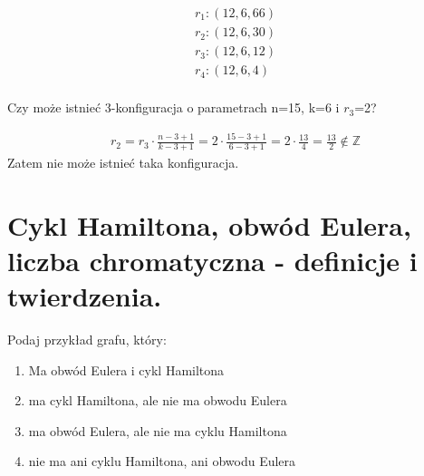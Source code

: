 \documentclass[main.tex]{subfiles}
\begin{document}
    \begin{align*}
        r_1: (12,6,66) \\
        r_2: (12,6,30) \\
        r_3: (12,6,12) \\
        r_4: (12,6,4) \\
    \end{align*}

    \begin{exercise}
        Czy może istnieć 3-konfiguracja o parametrach n=15, k=6 i $r_3$=2?
    \end{exercise}

    \begin{align*}
        r_2=r_3\cdot \frac{n-3+1}{k-3+1}=2\cdot \frac{15-3+1}{6-3+1}=2\cdot \frac{13}{4}=\frac{13}{2}\notin \mathbb{Z}
    \end{align*}
    Zatem nie może istnieć taka konfiguracja.


    \newpage

    \section{Cykl Hamiltona, obwód Eulera, liczba chromatyczna - definicje i twierdzenia.}

    \begin{exercise}
        Podaj przykład grafu, który:
        \begin{enumerate}
            \item Ma obwód Eulera i cykl Hamiltona
            \item ma cykl Hamiltona, ale nie ma obwodu Eulera
            \item ma obwód Eulera, ale nie ma cyklu Hamiltona
            \item nie ma ani cyklu Hamiltona, ani obwodu Eulera
        \end{enumerate}
    \end{exercise}
\end{document}
